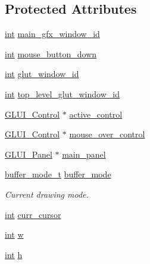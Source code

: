 \subsection*{Protected Attributes}
\begin{DoxyCompactItemize}
\item 
\hyperlink{wglext_8h_a500a82aecba06f4550f6849b8099ca21}{int} \hyperlink{class_g_l_u_i___main_a43cd4a18026504db98178d766d18a78c}{main\+\_\+gfx\+\_\+window\+\_\+id}
\item 
\hyperlink{wglext_8h_a500a82aecba06f4550f6849b8099ca21}{int} \hyperlink{class_g_l_u_i___main_a5002dc3587df870eb12a62be1568861b}{mouse\+\_\+button\+\_\+down}
\item 
\hyperlink{wglext_8h_a500a82aecba06f4550f6849b8099ca21}{int} \hyperlink{class_g_l_u_i___main_a4c2cd2330267eca938028a8a6fcb6382}{glut\+\_\+window\+\_\+id}
\item 
\hyperlink{wglext_8h_a500a82aecba06f4550f6849b8099ca21}{int} \hyperlink{class_g_l_u_i___main_afec9a40c9b4c139934236d094fcf81f6}{top\+\_\+level\+\_\+glut\+\_\+window\+\_\+id}
\item 
\hyperlink{class_g_l_u_i___control}{G\+L\+U\+I\+\_\+\+Control} $\ast$ \hyperlink{class_g_l_u_i___main_a552e13b05f63046ebe3f1911e27e3d58}{active\+\_\+control}
\item 
\hyperlink{class_g_l_u_i___control}{G\+L\+U\+I\+\_\+\+Control} $\ast$ \hyperlink{class_g_l_u_i___main_a74c11c17faf8a0c957d5654c420dc97f}{mouse\+\_\+over\+\_\+control}
\item 
\hyperlink{class_g_l_u_i___panel}{G\+L\+U\+I\+\_\+\+Panel} $\ast$ \hyperlink{class_g_l_u_i___main_a727ecf1f0315ff01503415dc420b47a2}{main\+\_\+panel}
\item 
\hyperlink{class_g_l_u_i___main_a0024f5e2750f6fe9e428ff885cf6d62e}{buffer\+\_\+mode\+\_\+t} \hyperlink{class_g_l_u_i___main_a4ba466d21144d6fd0c7984039523ad2f}{buffer\+\_\+mode}
\begin{DoxyCompactList}\small\item\em Current drawing mode. \end{DoxyCompactList}\item 
\hyperlink{wglext_8h_a500a82aecba06f4550f6849b8099ca21}{int} \hyperlink{class_g_l_u_i___main_a661d825dbff47caee733683f557491cf}{curr\+\_\+cursor}
\item 
\hyperlink{wglext_8h_a500a82aecba06f4550f6849b8099ca21}{int} \hyperlink{class_g_l_u_i___main_acee19f928a4837310f654431fda7cc1a}{w}
\item 
\hyperlink{wglext_8h_a500a82aecba06f4550f6849b8099ca21}{int} \hyperlink{class_g_l_u_i___main_a7c5cd9db296247eceb52c2aa84448e0f}{h}

\end{DoxyCompactItemize}
